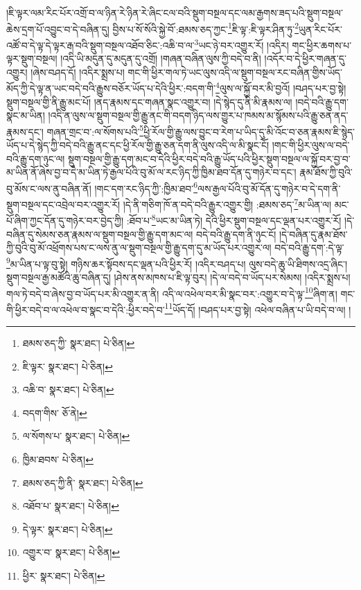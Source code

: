 །ཇི་ལྟར་ལམ་རིང་པོར་འགྲོ་བ་ལ་ཉིན་རེ་ཉིན་རེ་ཞིང་ངལ་བའི་སྡུག་བསྔལ་དང་ལམ་རྒྱགས་ཟད་པའི་སྡུག་བསྔལ་ཆེས་དྲག་པོ་འབྱུང་བ་དེ་བཞིན་དུ། བྱིས་པ་སོ་སོའི་སྐྱེ་བོ་:ཐམས་ཅད་ཀྱང་\footnote{ཐམས་ཅད་ཀྱི་  སྣར་ཐང་།  པེ་ཅིན། }ཇི་ལྟ་:ཇི་ལྟར་ཤིན་ཏུ་\footnote{ཇི་ལྟར་  སྣར་ཐང་།  པེ་ཅིན། }ཡུན་རིང་པོར་འཚོ་བ་དེ་ལྟ་དེ་ལྟར་རྒ་བའི་སྡུག་བསྔལ་འཐོབ་ཅིང་:འཆི་བ་ལ་\footnote{འཆི་བ་  སྣར་ཐང་།  པེ་ཅིན། }ཡང་ཉེ་བར་འགྱུར་རོ། །འདིར། གང་ཕྱིར་ཆགས་པ་ལྟར་སྡུག་བསྔལ། །འདི་ཡི་མདུན་དུ་མདུན་དུ་འགྲོ། །གཞན་བཞིན་ལུས་ཀྱི་བདེ་བ་ནི། །འདོར་བ་དེ་ཕྱིར་གཞན་དུ་འགྱུར། །ཞེས་བཤད་དོ། །འདིར་སྨྲས་པ། གང་གི་ཕྱིར་གལ་ཏེ་ཡང་ལུས་འདི་ལ་སྡུག་བསྔལ་རང་བཞིན་གྱིས་ཡོད་མོད་ཀྱི་དེ་ལྟ་ན་ཡང་བདེ་བའི་རྒྱུས་བཅོར་ཡོད་པ་དེའི་ཕྱིར་:བདག་གི་\footnote{བདག་གིས་  ཅོ་ནེ། }ལུས་ལ་སྐྱོ་བར་མི་བྱའོ། །བཤད་པར་བྱ་སྟེ། སྡུག་བསྔལ་གྱི་ནི་རྒྱུ་མང་པོ། །ནད་རྣམས་དང་གཞན་སྣང་འགྱུར་བ། །དེ་སྙེད་དུ་ནི་མི་རྣམས་ལ། །བདེ་བའི་རྒྱུ་དག་སྣང་མ་ཡིན། །འདི་ན་ལུས་ལ་སྡུག་བསྔལ་གྱི་རྒྱུ་ནང་གི་བདག་ཉིད་ལས་གྱུར་པ་ཁམས་མ་སྙོམས་པའི་རྒྱུ་ཅན་ནད་རྣམས་དང་། གཞན་གྲང་བ་:ལ་སོགས་པའི་\footnote{ལ་སོགས་པ་  སྣར་ཐང་།  པེ་ཅིན། }ཕྱི་རོལ་གྱི་རྒྱུ་ལས་བྱུང་བ་རེག་པ་ཡིད་དུ་མི་འོང་བ་ཅན་རྣམས་ཇི་སྙེད་ཡོད་པ་དེ་སྙེད་ཀྱི་བདེ་བའི་རྒྱུ་ནང་དང་ཕྱི་རོལ་གྱི་རྒྱུ་ཅན་དག་ནི་ལུས་འདི་ལ་མི་སྣང་ངོ། །གང་གི་ཕྱིར་ལུས་ལ་བདེ་བའི་རྒྱུ་དག་ཉུང་ལ། སྡུག་བསྔལ་གྱི་རྒྱུ་དག་མང་བ་དེའི་ཕྱིར་བདེ་བའི་རྒྱུ་ཡོད་པའི་ཕྱིར་སྡུག་བསྔལ་ལ་སྐྱོ་བར་བྱ་བ་མ་ཡིན་ནོ་ཞེས་བྱ་བ་དེ་མ་ཡིན་ཏེ་རྒྱལ་པོའི་བུ་མོ་ལ་རང་ཉིད་ཀྱི་ཁྱིམ་ཐབ་དོན་དུ་གཉེར་བ་དང་། རྣམ་ཐོས་ཀྱི་བུའི་བུ་མོས་ང་ལས་ནུ་བཞིན་ནོ། །གང་དག་རང་ཉིད་ཀྱི་:ཁྱིམ་ཐབ་\footnote{ཁྱིམ་ཐབས་  པེ་ཅིན། }ལས་རྒྱལ་པོའི་བུ་མོ་དོན་དུ་གཉེར་བ་དེ་དག་ནི་སྡུག་བསྔལ་དང་འབྲེལ་བར་འགྱུར་རོ། །དེ་ནི་གཅིག་ཁོ་ན་བདེ་བའི་རྒྱུར་འགྱུར་གྱི། :ཐམས་ཅད་\footnote{ཐམས་ཅད་ཀྱི་ནི་  སྣར་ཐང་།  པེ་ཅིན། }མ་ཡིན་ལ། མང་པོ་ཞིག་ཀྱང་དོན་དུ་གཉེར་བར་བྱེད་ཀྱི། :ཐོབ་པ་\footnote{འཐོབ་པ་  སྣར་ཐང་།  པེ་ཅིན། }ཡང་མ་ཡིན་ཏེ། དེའི་ཕྱིར་སྡུག་བསྔལ་དང་ལྡན་པར་འགྱུར་རོ། །དེ་བཞིན་དུ་སེམས་ཅན་རྣམས་ལ་སྡུག་བསྔལ་གྱི་རྒྱུ་དག་མང་ལ། བདེ་བའི་རྒྱུ་དག་ནི་ཉུང་ངོ། །དེ་བཞིན་དུ་རྣམ་ཐོས་ཀྱི་བུའི་བུ་མོ་འཕྲོགས་པས་ང་ལས་ནུ་ལ་སྡུག་བསྔལ་གྱི་རྒྱུ་དག་དུ་མ་ཡོད་པར་འགྱུར་ལ། བདེ་བའི་རྒྱུ་དག་:དེ་ལྟ་\footnote{དེ་ལྟར་  སྣར་ཐང་།  པེ་ཅིན། }མ་ཡིན་པ་ལྟ་བུ་སྟེ། གཉིས་ཆར་སྟོབས་དང་ལྡན་པའི་ཕྱིར་རོ། །འདིར་བཤད་པ། ལུས་བདེ་ཆུ་ཡི་ཐིགས་འདྲ་ཞིང་། སྡུག་བསྔལ་རྒྱ་མཚོའི་ཆུ་བཞིན་དུ། །ཤེས་ནས་མཁས་པ་ཇི་ལྟ་བུར། །དེ་ལ་བདེ་བ་ཡོད་པར་སེམས། །འདིར་སྨྲས་པ། གལ་ཏེ་བདེ་བ་ཞེས་བྱ་བ་ཡོད་པར་མི་འགྱུར་ན་ནི། འདི་ལ་འཕེལ་བར་མི་སྣང་བར་:འགྱུར་བ་དེ་ལྟ་\footnote{འགྱུར་བ་  སྣར་ཐང་།  པེ་ཅིན། }ཞིག་ན། གང་གི་ཕྱིར་བདེ་བ་ལ་འཕེལ་བ་སྣང་བ་དེའི་:ཕྱིར་བདེ་བ་\footnote{ཕྱིར་  སྣར་ཐང་།  པེ་ཅིན། }ཡོད་དོ། །བཤད་པར་བྱ་སྟེ། འཕེལ་བཞིན་པ་ཡི་བདེ་བ་ལ། །
